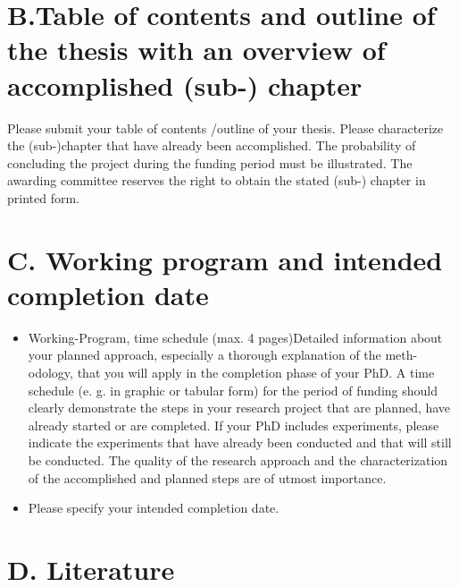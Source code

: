\documentclass[11pt, notitlepage]{article} %
\begin{document}

\newpage
\section*{B.Table of contents and outline of the thesis with an overview of accomplished (sub-) chapter}
Please submit your table of contents /outline of your thesis. Please characterize the (sub-)chapter that have already been accomplished. The probability of concluding the project during the funding period  must  be  illustrated.  The awarding committee reserves the right to obtain the stated (sub-) chapter in printed form.


\newpage
\section*{C. Working program and intended completion date}
\begin{itemize}
    \item Working-Program, time schedule (max. 4 pages)Detailed information about your planned approach, especially a thorough explanation of the meth-odology, that you will apply in the completion phase of your  PhD. A time schedule (e. g. in graphic or  tabular  form)  for  the  period  of  funding  should  clearly  demonstrate  the  steps  in  your  research  project that are planned, have already started or are completed. If your PhD includes experiments, please indicate the experiments that have already been conducted and that will still be conducted. The  quality  of  the  research  approach  and  the  characterization  of  the  accomplished  and  planned  steps are of utmost importance.
    \item Please specify your intended completion date.
\end{itemize}

\newpage
\section*{D. Literature}

\newpage


\end{document}
